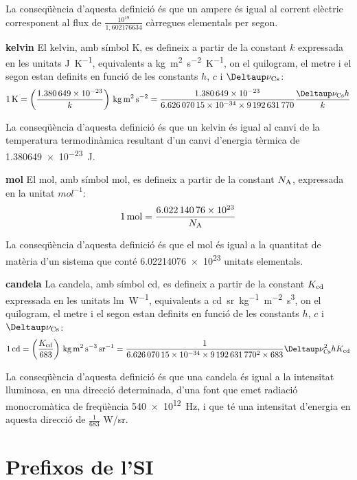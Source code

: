 \begin{list}{}
    La conseqüència d'aquesta definició és que un ampere és igual al corrent elèctric corresponent al flux de $\frac{10^{19}}{1,602176634}$   càrregues elementals per segon.

   \item[\textbf{kelvin}]  El kelvin, amb símbol K, es defineix a partir de la constant $k$ expressada en les unitats \unit{J.K^{-1}},  equivalents a \unit{kg.m^2.s^{-2}.K^{-1}},  on el quilogram, el metre i el segon estan definits en funció de les constants $h$, $c$ i $\Deltaup\nu\ped{Cs}$:
       \[
            \qty{1}{K} = \left(\frac{\num{1,380649e-23}}{k}\right)\unit{\,kg.m^2.s^{-2}} = \frac{\num{1,380649e-23}}{\num{6,62607015 e-34}\times\num{9192631770}} \frac{\Deltaup\nu\ped{Cs} h}{k}
       \]

    La conseqüència d'aquesta definició és que un kelvin és igual al canvi de la temperatura termodinàmica resultant d'un canvi d'energia tèrmica de \qty{1,380649e-23}{J}.

   \item[\textbf{mol}]  El mol, amb símbol mol, es defineix a partir de la constant $N_\mathrm{A}$, expressada en la unitat  $\unit{mol^{-1}}$:
       \[
            \qty{1}{mol} = \frac{\num{6,02214076 e23}}{N_\mathrm{A}}
       \]

    La conseqüència d'aquesta definició és que el mol és igual a la quantitat de matèria d'un sistema que conté
    \num{6,02214076 e23} unitats elementals.

   \item[\textbf{candela}] La candela, amb símbol cd, es defineix a partir de la constant $K_\mathrm{cd}$ expressada en les unitats \unit{lm.W^{-1}},  equivalents a \unit{cd.sr.kg^{-1}.m^{-2}.s^3},  on el quilogram, el metre i el segon estan definits en funció de les constants $h$, $c$ i $\Deltaup\nu\ped{Cs}$:
       \[
            \qty{1}{cd} = \left(\frac{K\ped{cd}}{683}\right)\unit{\,kg.m^2.s^{-3}.sr^{-1}} = \frac{1}{\num{6,62607015 e-34}\times\num{9192631770}^2\times 683} \Deltaup\nu\ped{Cs}^2 h K\ped{cd}
       \]

    La conseqüència d'aquesta definició és que una candela és igual a la intensitat lluminosa, en una direcció determinada,   d'una font que emet radiació monocromàtica de freqüència \qty{540e12}{Hz}, i
   que té una intensitat d'energia en aquesta direcció de $\frac{1}{683}$ \unit{W/sr}.
\end{list}


\section{Prefixos de l'SI}

